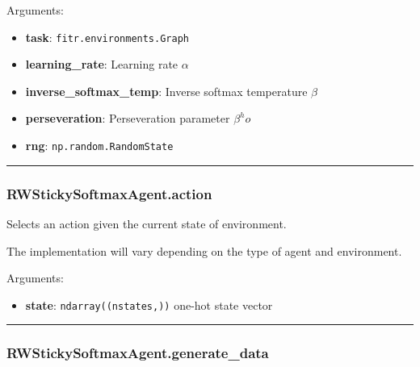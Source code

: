 Arguments:

\begin{itemize}
\tightlist
\item
  \textbf{task}: \texttt{fitr.environments.Graph}
\item
  \textbf{learning\_rate}: Learning rate \(\alpha\)
\item
  \textbf{inverse\_softmax\_temp}: Inverse softmax temperature \(\beta\)
\item
  \textbf{perseveration}: Perseveration parameter \(\beta^ ho\)
\item
  \textbf{rng}: \texttt{np.random.RandomState}
\end{itemize}

\begin{center}\rule{0.5\linewidth}{\linethickness}\end{center}

\subsubsection{RWStickySoftmaxAgent.action}\label{rwstickysoftmaxagent.action}

\begin{Shaded}
\begin{Highlighting}[]
\end{Highlighting}
\end{Shaded}

Selects an action given the current state of environment.

The implementation will vary depending on the type of agent and
environment.

Arguments:

\begin{itemize}
\tightlist
\item
  \textbf{state}: \texttt{ndarray((nstates,))} one-hot state vector
\end{itemize}

\begin{center}\rule{0.5\linewidth}{\linethickness}\end{center}

\subsubsection{RWStickySoftmaxAgent.generate\_data}\label{rwstickysoftmaxagent.generate_data}

\begin{Shaded}
\begin{Highlighting}[]
\end{Highlighting}
\end{Shaded}

